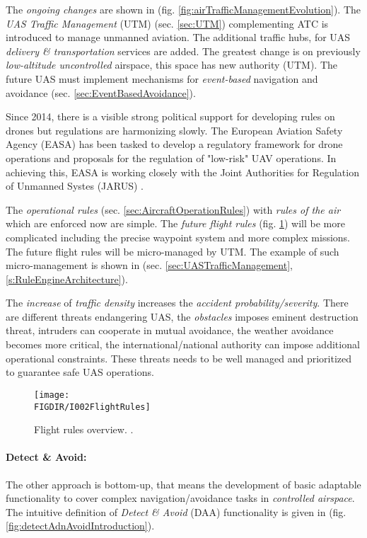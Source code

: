 The \emph{ongoing changes} are shown in (fig. \ref{fig:airTrafficManagementEvolution}). The \emph{UAS Traffic Management} (UTM) (sec. \ref{sec:UTM}) complementing ATC is introduced to manage unmanned aviation. The additional traffic hubs, for UAS \emph{delivery \& transportation} services are added. The greatest change is on previously \emph{low-altitude uncontrolled} airspace, this space has new authority (UTM). The future UAS must implement mechanisms for \emph{event-based} navigation and avoidance (sec. \ref{sec:EventBasedAvoidance}).

Since 2014, there is a visible strong political support for developing rules on drones but regulations are harmonizing slowly. The European Aviation Safety Agency (EASA) has been tasked to develop a regulatory framework for drone operations and proposals for the regulation of "low-risk" UAV operations. In achieving this, EASA is working closely with the Joint Authorities for Regulation of Unmanned Systes (JARUS) \cite{jarus2016regulations}.

The \emph{operational rules} (sec. \ref{sec:AircraftOperationRules}) with \emph{rules of the air} \cite{icaoAnnex2} which are enforced now are simple. The \emph{future flight rules} (fig. \ref{fig:flightRulesIntro}) will be more complicated including the precise waypoint system and more complex missions. The future flight rules will be micro-managed by UTM. The example of such micro-management is shown in (sec. \ref{sec:UASTrafficManagement}, \ref{s:RuleEngineArchitecture}). 

The \emph{increase} of \emph{traffic density} increases the \emph{accident probability/severity}.  There are different threats endangering UAS, the \emph{obstacles} imposes eminent destruction threat, intruders can cooperate in mutual avoidance, the weather avoidance becomes more critical, the international/national authority can impose additional operational constraints. These threats needs to be well managed and prioritized to guarantee safe UAS operations.

\begin{figure}[H]
    \centering
    \texttt{[image: \\FIGDIR/I002FlightRules]}
    \caption{Flight rules overview. \cite{airbusUTM2018blueprint}.}
    \label{fig:flightRulesIntro}
\end{figure}

\paragraph{Detect \& Avoid:} The other approach is bottom-up, that means the development of basic adaptable functionality to cover complex navigation/avoidance tasks in \emph{controlled airspace}. The intuitive definition of \emph{Detect \& Avoid} (DAA) functionality is given in (fig. \ref{fig:detectAdnAvoidIntroduction}).

